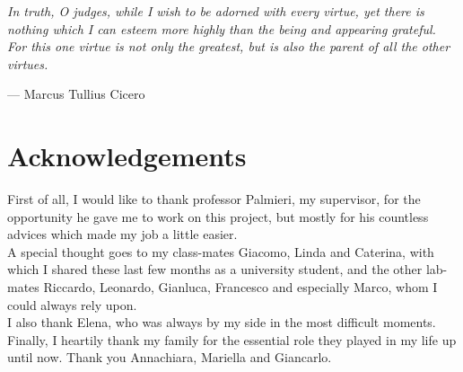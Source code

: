 

\begin{flushright}{\slshape    
 In truth, O judges, while I wish to be adorned with every virtue, yet there is nothing which I can esteem more highly than the being and appearing grateful. For this one virtue is not only the greatest, but is also the parent of all the other virtues.} \medskip

--- Marcus Tullius Cicero
\end{flushright}
\bigskip


\begingroup

\let\clearpage\relax
\let\cleardoublepage\relax
\let\cleardoublepage\relax

\chapter*{Acknowledgements}

\noindent First of all, I would like to thank professor Palmieri, my supervisor, for the opportunity he gave me to work on this project, but mostly for his countless advices which made my job a little easier. \\

\noindent A special thought goes to my class-mates Giacomo, Linda and Caterina, with which I shared these last few months as a university student, and the other lab-mates Riccardo, Leonardo, Gianluca, Francesco and especially Marco, whom I could always rely upon. \\

\noindent  I also thank Elena, who was always by my side in the most difficult moments. \\ 

\noindent Finally, I heartily thank my family for the essential role they played in my life up until now. Thank you Annachiara, Mariella and Giancarlo.  \\

\bigskip

\endgroup
